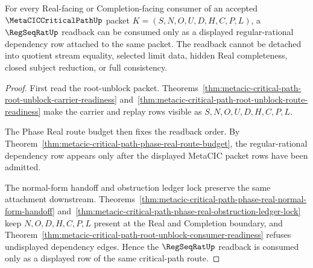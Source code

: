 \begin{theorem}
\label{thm:metacic-critical-path-regseqrat-readback-readiness}
For every Real-facing or Completion-facing consumer of an accepted $\MetaCICCriticalPathUp$ packet $K=(S,N,O,U,D,H,C,P,L)$, a $\RegSeqRatUp$ readback can be consumed only as a displayed regular-rational dependency row attached to the same packet. The readback cannot be detached into quotient stream equality, selected limit data, hidden Real completeness, closed subject reduction, or full consistency.
\end{theorem}
\begin{proof}
First read the root-unblock packet. Theorems~\ref{thm:metacic-critical-path-root-unblock-carrier-readiness} and~\ref{thm:metacic-critical-path-root-unblock-route-readiness} make the carrier and replay rows visible as $S,N,O,U,D,H,C,P,L$.

The Phase Real route budget then fixes the readback order. By Theorem~\ref{thm:metacic-critical-path-phase-real-route-budget}, the regular-rational dependency row appears only after the displayed MetaCIC packet rows have been admitted.

The normal-form handoff and obstruction ledger lock preserve the same attachment downstream. Theorems~\ref{thm:metacic-critical-path-phase-real-normal-form-handoff} and~\ref{thm:metacic-critical-path-phase-real-obstruction-ledger-lock} keep $N,O,D,H,C,P,L$ present at the Real and Completion boundary, and Theorem~\ref{thm:metacic-critical-path-root-unblock-consumer-readiness} refuses undisplayed dependency edges. Hence the $\RegSeqRatUp$ readback is consumed only as a displayed row of the same critical-path route.
\end{proof}

